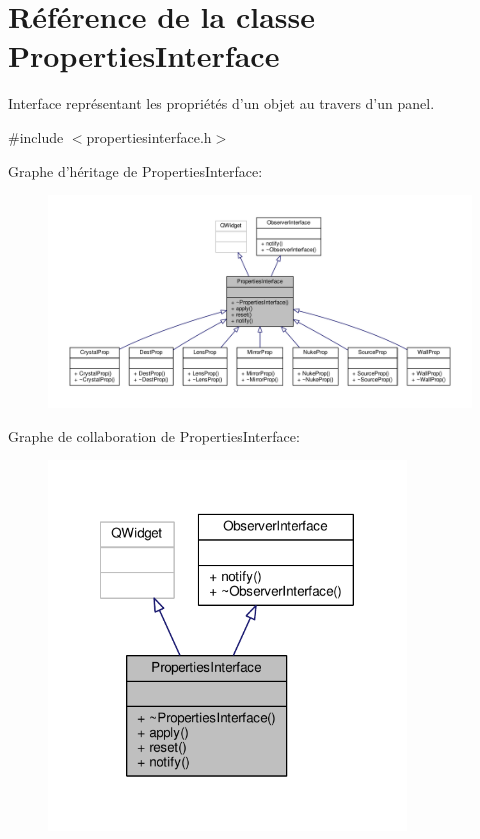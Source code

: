 \hypertarget{classPropertiesInterface}{\section{Référence de la classe Properties\+Interface}
\label{classPropertiesInterface}
}


Interface représentant les propriétés d'un objet au travers d'un panel.  




{\ttfamily \#include $<$propertiesinterface.\+h$>$}



Graphe d'héritage de Properties\+Interface\+:
\nopagebreak
\begin{figure}[H]
\begin{center}
\leavevmode
\includegraphics[width=350pt]{d5/d18/classPropertiesInterface__inherit__graph}
\end{center}
\end{figure}


Graphe de collaboration de Properties\+Interface\+:
\nopagebreak
\begin{figure}[H]
\begin{center}
\leavevmode
\includegraphics[width=269pt]{da/d04/classPropertiesInterface__coll__graph}
\end{center}
\end{figure}
